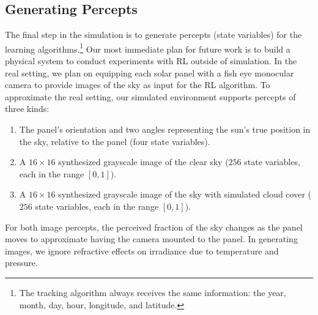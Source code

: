 \documentclass{article}
\begin{document}
{%
\subsection{Generating Percepts}


The final step in the simulation is to generate percepts (state variables) for the learning algorithms.\footnote{The tracking algorithm always receives the same information: the year, month, day, hour, longitude, and latitude.} Our most immediate plan for future work is to build a physical system to conduct experiments with RL outside of simulation. In the real setting, we plan on equipping each solar panel with a fish eye monocular camera to provide images of the sky as input for the RL algorithm. To approximate the real setting, our simulated environment supports percepts of three kinds:
\begin{enumerate}
\item The panel's orientation and two angles representing the sun's true position in the sky, relative to the panel (four state variables).
\item A $16 \times 16$ synthesized grayscale image of the clear sky ($256$ state variables, each in the range $[0,1]$).
\item A $16\times 16$ synthesized grayscale image of the sky with simulated cloud cover ($256$ state variables, each in the range $[0,1]$).
\end{enumerate}
For both image percepts, the perceived fraction of the sky changes as the panel moves to approximate having the camera mounted to the panel. In generating images, we ignore refractive effects on irradiance due to temperature and pressure.





}
\end{document}
